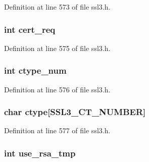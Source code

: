 Definition at line 573 of file ssl3.\+h.

\subsubsection[{\texorpdfstring{cert\+\_\+req}{cert_req}}]{\setlength{\rightskip}{0pt plus 5cm}int cert\+\_\+req}\hypertarget{structssl3__state__st_af3f6e084c68d5c0725a2ae418f5c2ca0}{}\label{structssl3__state__st_af3f6e084c68d5c0725a2ae418f5c2ca0}


Definition at line 575 of file ssl3.\+h.

\subsubsection[{\texorpdfstring{ctype\+\_\+num}{ctype_num}}]{\setlength{\rightskip}{0pt plus 5cm}int ctype\+\_\+num}\hypertarget{structssl3__state__st_a23119eb985819cfb7ddbfba114b3930f}{}\label{structssl3__state__st_a23119eb985819cfb7ddbfba114b3930f}


Definition at line 576 of file ssl3.\+h.

\subsubsection[{\texorpdfstring{ctype}{ctype}}]{\setlength{\rightskip}{0pt plus 5cm}char ctype\mbox{[}{\bf S\+S\+L3\+\_\+\+C\+T\+\_\+\+N\+U\+M\+B\+ER}\mbox{]}}\hypertarget{structssl3__state__st_a7aa1f45161d8aa824b0d73d2c38093c0}{}\label{structssl3__state__st_a7aa1f45161d8aa824b0d73d2c38093c0}


Definition at line 577 of file ssl3.\+h.

\subsubsection[{\texorpdfstring{use\+\_\+rsa\+\_\+tmp}{use_rsa_tmp}}]{\setlength{\rightskip}{0pt plus 5cm}int use\+\_\+rsa\+\_\+tmp}\hypertarget{structssl3__state__st_af7d2f98bd72ef426edc1e2ba797231f3}{}\label{structssl3__state__st_af7d2f98bd72ef426edc1e2ba797231f3}


